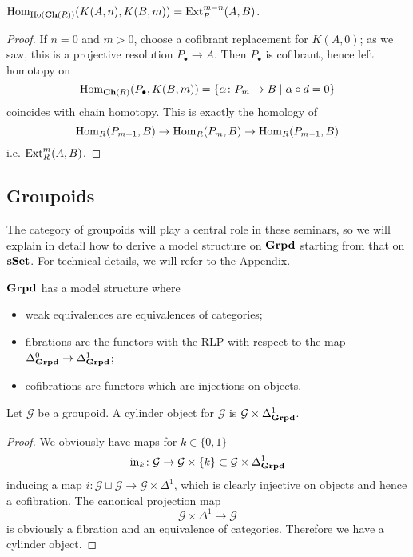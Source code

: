 \begin{prop}
$\mathrm{Hom}_{\mathrm{Ho}(\mathbf{Ch}(R))}(K(A,n),K(B,m)) = \mathrm{Ext}_R^{m-n}(A,B)$.
\end{prop}

\begin{proof}
If $n = 0$ and $m > 0$, choose a cofibrant replacement for $K(A,0)$; as we saw, this is a projective resolution $P_\bullet \to A$. Then $P_\bullet$ is cofibrant, hence left homotopy on
\[
\mathrm{Hom}_{\mathbf{Ch}(R)}(P_\bullet, K(B,m)) = \{\alpha \colon P_m \to B \mid \alpha \circ d = 0 \}
\]
coincides with chain homotopy. This is exactly the homology of
\[
\mathrm{Hom}_R(P_{m+1},B) \to \mathrm{Hom}_R(P_m,B) \to \mathrm{Hom}_R(P_{m-1},B)
\]
i.e. $\mathrm{Ext}^m_R(A,B)$.
\end{proof}

\subsection{Groupoids} \label{model structure on groupoids}

The category of groupoids will play a central role in these seminars, so we will explain in detail how to derive a model structure on $\mathbf{Grpd}$ starting from that on $\mathbf{sSet}$. For technical details, we will refer to the Appendix.

\begin{thm}
$\mathbf{Grpd}$ has a model structure where
\begin{itemize}
\item weak equivalences are equivalences of categories;
\item fibrations are the functors with the RLP with respect to the map $\Delta^0_{\mathbf{Grpd}} \to \Delta^1_{\mathbf{Grpd}}$;
\item cofibrations are functors which are injections on objects.
\end{itemize}
\end{thm} %

\begin{prop} \label{prop cylinder for groupoids}
Let $\mathcal G$ be a groupoid. A cylinder object for $\mathcal G$ is $\mathcal G \times \Delta^1_{\mathbf{Grpd}}$.
\end{prop}

\begin{proof}
We obviously have maps for $k \in \{0,1\}$
\[
\mathrm{in}_k \colon \mathcal G \to \mathcal G \times \{k\} \subset \mathcal G \times \Delta^1_{\mathbf{Grpd}}
\]
inducing a map $i \colon \mathcal G \sqcup \mathcal G \to \mathcal G \times \Delta^1$, which is clearly injective on objects and hence a cofibration. The canonical projection map
\[
\mathcal G \times \Delta^1 \to \mathcal G
\]
is obviously a fibration and an equivalence of categories. Therefore we have a cylinder object.
\end{proof}

